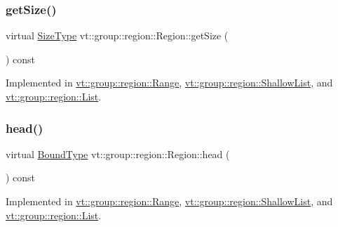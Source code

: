 \mbox{\label{structvt_1_1group_1_1region_1_1_region_ab0db5f78c57943b4b9973ba2c7c619f7}} 
\subsubsection{\texorpdfstring{get\+Size()}{getSize()}}
{\footnotesize\ttfamily virtual \hyperlink{structvt_1_1group_1_1region_1_1_region_a9bb381adf31111aae34dbc644bad6c1f}{Size\+Type} vt\+::group\+::region\+::\+Region\+::get\+Size (\begin{DoxyParamCaption}{ }\end{DoxyParamCaption}) const\hspace{0.3cm}{\ttfamily [pure virtual]}}



Implemented in \hyperlink{structvt_1_1group_1_1region_1_1_range_a111a632a4bba6b6940a3d036bd4cba76}{vt\+::group\+::region\+::\+Range}, \hyperlink{structvt_1_1group_1_1region_1_1_shallow_list_a6b8fe82607fdcf88ac33ad387192fbb2}{vt\+::group\+::region\+::\+Shallow\+List}, and \hyperlink{structvt_1_1group_1_1region_1_1_list_a9a74188a75483097c41253616527ac46}{vt\+::group\+::region\+::\+List}.

\mbox{\label{structvt_1_1group_1_1region_1_1_region_a09d21333389937f11dd5d3e6ba566c54}} 
\subsubsection{\texorpdfstring{head()}{head()}}
{\footnotesize\ttfamily virtual \hyperlink{structvt_1_1group_1_1region_1_1_region_abf426ff85bed72c1c6524fad6a9f1751}{Bound\+Type} vt\+::group\+::region\+::\+Region\+::head (\begin{DoxyParamCaption}{ }\end{DoxyParamCaption}) const\hspace{0.3cm}{\ttfamily [pure virtual]}}



Implemented in \hyperlink{structvt_1_1group_1_1region_1_1_range_ab6abce20eb32475d0ae734770b6586c0}{vt\+::group\+::region\+::\+Range}, \hyperlink{structvt_1_1group_1_1region_1_1_shallow_list_a249b65b9cc1a44131cf52488baea9a41}{vt\+::group\+::region\+::\+Shallow\+List}, and \hyperlink{structvt_1_1group_1_1region_1_1_list_a99c726e227dbac4f8efaa45a37033238}{vt\+::group\+::region\+::\+List}.

